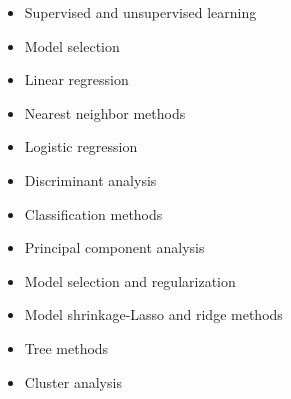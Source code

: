 \begin{itemize}
\item Supervised and unsupervised learning
\item Model selection
\item Linear regression 
\item Nearest neighbor methods
\item Logistic regression
\item Discriminant analysis
\item Classification methods
\item Principal component analysis
\item Model selection and regularization
\item Model shrinkage-Lasso and ridge methods
\item Tree methods
\item Cluster analysis
\end{itemize}


